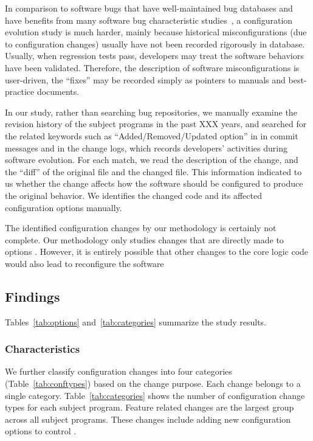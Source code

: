 In comparison to software bugs that have well-maintained
bug databases and have benefits from many
software bug characteristic studies~\cite{},
a configuration evolution study is much harder, mainly
because historical misconfigurations (due
to configuration changes) usually have not been
recorded rigorously in database. Usually, when
regression tests pass, developers may treat the
software behaviors have been validated. Therefore,
the description of software misconfigurations is user-driven,
the ``fixes'' may be recorded simply as pointers
to manuals and best-practice documents.

In our study, rather than searching bug repositories,
we manually examine the revision history of the subject programs
in the past XXX years, and searched for the related
keywords such as ``Added/Removed/Updated option'' in
in commit messages and in the change logs,
which records developers' activities
during software evolution. For each match,
we read the description of the change,
and the ``diff'' of the original file and the
changed file. This information indicated
to us whether the change affects how the
software should be configured to produce
the original behavior. We identifies the
changed code and its affected configuration options
manually.

The identified configuration changes by our methodology is certainly not complete.
Our methodology only studies changes that are directly made to options .
However, it is entirely possible that other
changes to the core logic code would also
 lead to reconfigure the software


\subsection{Findings}

Tables~\ref{tab:options} and~\ref{tab:categories}
summarize the study results.



\subsubsection{Characteristics}

We further classify configuration changes into
four categories (Table~\ref{tab:conftypes}) based
on the change purpose. Each change belongs to a single category.
Table~\ref{tab:categories} shows the number of
configuration change types for each subject program.
Feature related changes are the largest group across
all subject programs. These changes include
adding new configuration options to control .

